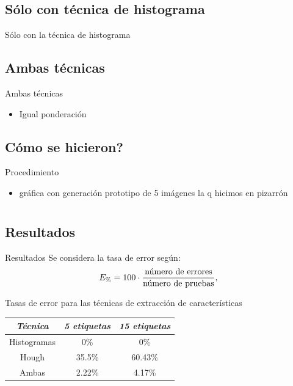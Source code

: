 \documentclass[spanish]{beamer}
\begin{document}
\subsection{Sólo con técnica de histograma}
\begin{frame}{Sólo con la técnica de histograma}
\end{frame}

\subsection{Ambas técnicas}
\begin{frame}{Ambas técnicas}
  \begin{itemize}
  \item Igual ponderación
  \end{itemize}
\end{frame}

\subsection{Cómo se hicieron?}
\begin{frame}{Procedimiento}
  \begin{itemize}
  \item gráfica con generación prototipo de 5 imágenes la q hicimos en pizarrón
  \end{itemize}
\end{frame}

\section[Resultados]{}
\subsection{Resultados}
\begin{frame}{Resultados}
  Se considera la tasa de error según:
  \begin{equation*}
    E_{\%}=100\cdot\frac{\textrm{número de errores}}{\textrm{número de pruebas}},
  \end{equation*}


  Tasas de error para las técnicas de extracción de características
  \begin{center}\begin{tabular}{ccc}
      \hline \emph{{Técnica}} & \emph{5 etiquetas} & \emph{15 etiquetas}\\
      \hline Histogramas & 0\% & 0\%\\
      \hline Hough & 35.5\% & 60.43\%\\
      \hline Ambas & 2.22\% & 4.17\%\\
      \hline
  \end{tabular}\end{center}
  \label{tablaerrores}


\end{frame}
\end{document}
